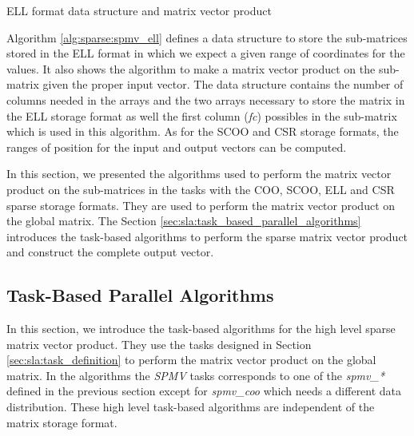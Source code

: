 \begin{algorithm}[h]
	\DontPrintSemicolon
	\SetAlgoVlined
	\caption{ELL format data structure and matrix vector product\label{alg:sparse:spmv_ell}}

	\;
\end{algorithm}

Algorithm \ref{alg:sparse:spmv_ell} defines a data structure to store the sub-matrices stored in the ELL format in which we expect a given range of coordinates for the values.
It also shows the algorithm to make a matrix vector product on the sub-matrix given the proper input vector.
The data structure contains the number of columns needed in the arrays and the two arrays necessary to store the matrix in the ELL storage format as well the first column (\textit{fc}) possibles in the sub-matrix which is used in this algorithm.
As for the SCOO and CSR storage formats, the ranges of position for the input and output vectors can be computed.

In this section, we presented the algorithms used to perform the matrix vector product on the sub-matrices in the tasks with the COO, SCOO, ELL and CSR sparse storage formats.
They are used to perform the matrix vector product on the global matrix.
The Section \ref{sec:sla:task_based_parallel_algorithms} introduces the task-based algorithms to perform the sparse matrix vector product and construct the complete output vector.

\subsection{Task-Based Parallel Algorithms \label{sec:sla:task_based_parallel_algorithms}}

In this section, we introduce the task-based algorithms for the high level sparse matrix vector product.
They use the tasks designed in Section \ref{sec:sla:task_definition} to perform the matrix vector product on the global matrix.
In the algorithms the \textit{SPMV} tasks corresponds to one of the \textit{spmv\_*} defined in the previous section except for \textit{spmv\_coo} which needs a different data distribution.
These high level task-based algorithms are independent of the matrix storage format.


